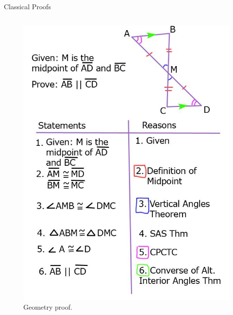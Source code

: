 \documentclass{zkdl-presentation-template}
\begin{document}
\begin{frame}{Classical Proofs}
\begin{columns}
\begin{column}{0.4\textwidth}
\begin{figure}
                    \includegraphics[width=1.0\textwidth]{images/lecture_6/geometry-proof.jpg}
                    \caption{Geometry proof.}
                \end{figure}
            \end{column}
            \end{columns}
    \end{frame}
\end{document}
